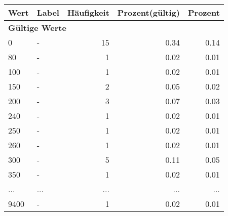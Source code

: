      \begin{longtable}{lXrrr}
     \toprule
     \textbf{Wert} & \textbf{Label} & \textbf{Häufigkeit} & \textbf{Prozent(gültig)} & \textbf{Prozent} \\
     \endhead
     \midrule
     \multicolumn{5}{l}{\textbf{Gültige Werte}}\\
        0 & \multicolumn{1}{X}{-} & %
          \num{15} &
          \num[round-mode=places,round-precision=2]{0.34} &
          \num[round-mode=places,round-precision=2]{0.14} \\
        80 & \multicolumn{1}{X}{-} & %
          \num{1} &
          \num[round-mode=places,round-precision=2]{0.02} &
          \num[round-mode=places,round-precision=2]{0.01} \\
        100 & \multicolumn{1}{X}{-} & %
          \num{1} &
          \num[round-mode=places,round-precision=2]{0.02} &
          \num[round-mode=places,round-precision=2]{0.01} \\
        150 & \multicolumn{1}{X}{-} & %
          \num{2} &
          \num[round-mode=places,round-precision=2]{0.05} &
          \num[round-mode=places,round-precision=2]{0.02} \\
        200 & \multicolumn{1}{X}{-} & %
          \num{3} &
          \num[round-mode=places,round-precision=2]{0.07} &
          \num[round-mode=places,round-precision=2]{0.03} \\
        240 & \multicolumn{1}{X}{-} & %
          \num{1} &
          \num[round-mode=places,round-precision=2]{0.02} &
          \num[round-mode=places,round-precision=2]{0.01} \\
        250 & \multicolumn{1}{X}{-} & %
          \num{1} &
          \num[round-mode=places,round-precision=2]{0.02} &
          \num[round-mode=places,round-precision=2]{0.01} \\
        260 & \multicolumn{1}{X}{-} & %
          \num{1} &
          \num[round-mode=places,round-precision=2]{0.02} &
          \num[round-mode=places,round-precision=2]{0.01} \\
        300 & \multicolumn{1}{X}{-} & %
          \num{5} &
          \num[round-mode=places,round-precision=2]{0.11} &
          \num[round-mode=places,round-precision=2]{0.05} \\
        350 & \multicolumn{1}{X}{-} & %
          \num{1} &
          \num[round-mode=places,round-precision=2]{0.02} &
          \num[round-mode=places,round-precision=2]{0.01} \\
       ... & ... & ... & ... & ... \\
        9400 & \multicolumn{1}{X}{-} & %
          \num{1} &
          \num[round-mode=places,round-precision=2]{0.02} &
          \num[round-mode=places,round-precision=2]{0.01} \\


\end{longtable}
